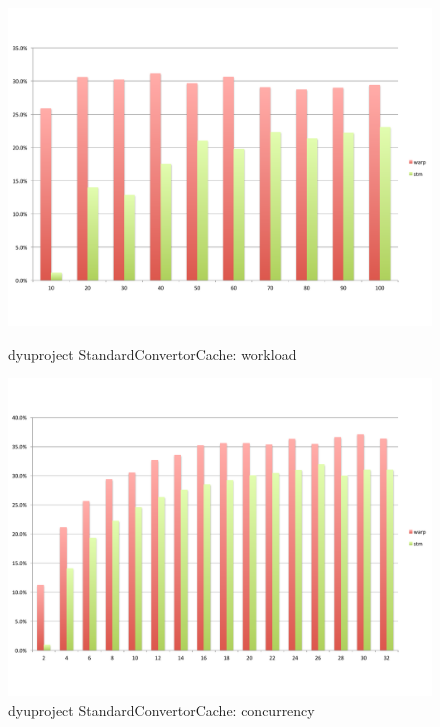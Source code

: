 \begin{figure}
\begin{minipage}{0.45 \textwidth}
		\includegraphics[width=\textwidth]{../../eval/32threads/case2it.pdf}
		\caption{\label{Fi:case2it}dyuproject {\sf StandardConvertorCache}: workload}
	\end{minipage}
	\hspace{0.1 \textwidth}
	\begin{minipage}{0.45 \textwidth}
		\includegraphics[width=\textwidth]{../../eval/32threads/case2th.pdf}
		\caption{\label{Fi:case2th}dyuproject {\sf StandardConvertorCache}: concurrency}
	\end{minipage}
	\begin{minipage}{0.45 \textwidth}

\end{minipage}
\end{figure}

